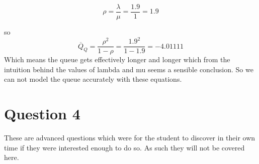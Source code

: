 \documentclass[10pt]{article}
\begin{document}
$$
\rho=\frac{\lambda}{\mu}=\frac{1.9}{1}=1.9
$$


so
$$
\overline{Q}_Q=\frac{\rho^2}{1-\rho}=\frac{1.9^2}{1-1.9}=-4.01111
$$
Which means the queue gets effectively longer and longer which
from the intuition behind the values of lambda and mu seems a
sensible conclusion. So we can not model the queue accurately with
these equations.
\section*{Question 4}
These are advanced questions which were for the student to
discover in their own time if they were interested enough to do
so. As such they will not be covered here.
\end{document}
